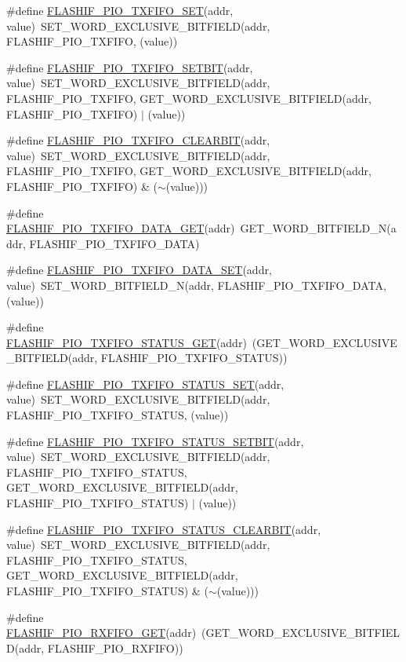 \begin{DoxyCompactItemize}
\#define \hyperlink{a00551_a42e4e34b3ade7887b46be7d86d9ab5f6}{FLASHIF\_\-PIO\_\-TXFIFO\_\-SET}(addr, value)~SET\_\-WORD\_\-EXCLUSIVE\_\-BITFIELD(addr, FLASHIF\_\-PIO\_\-TXFIFO, (value))
\item 
\#define \hyperlink{a00551_a2b4ca60d8d1a10158a23a42154475edd}{FLASHIF\_\-PIO\_\-TXFIFO\_\-SETBIT}(addr, value)~SET\_\-WORD\_\-EXCLUSIVE\_\-BITFIELD(addr, FLASHIF\_\-PIO\_\-TXFIFO, GET\_\-WORD\_\-EXCLUSIVE\_\-BITFIELD(addr, FLASHIF\_\-PIO\_\-TXFIFO) $|$ (value))
\item 
\#define \hyperlink{a00551_a27c6d46f90a6efbfdf27007e287eb5e5}{FLASHIF\_\-PIO\_\-TXFIFO\_\-CLEARBIT}(addr, value)~SET\_\-WORD\_\-EXCLUSIVE\_\-BITFIELD(addr, FLASHIF\_\-PIO\_\-TXFIFO, GET\_\-WORD\_\-EXCLUSIVE\_\-BITFIELD(addr, FLASHIF\_\-PIO\_\-TXFIFO) \& ($\sim$(value)))
\item 
\#define \hyperlink{a00551_a734cd9e347d0c49f25930db7a51330df}{FLASHIF\_\-PIO\_\-TXFIFO\_\-DATA\_\-GET}(addr)~GET\_\-WORD\_\-BITFIELD\_\-N(addr, FLASHIF\_\-PIO\_\-TXFIFO\_\-DATA)
\item 
\#define \hyperlink{a00551_a01dbecbeb0015354621b16b4222647cb}{FLASHIF\_\-PIO\_\-TXFIFO\_\-DATA\_\-SET}(addr, value)~SET\_\-WORD\_\-BITFIELD\_\-N(addr, FLASHIF\_\-PIO\_\-TXFIFO\_\-DATA, (value))
\item 
\#define \hyperlink{a00551_afaefd1b86f2fb798ede470689471e67d}{FLASHIF\_\-PIO\_\-TXFIFO\_\-STATUS\_\-GET}(addr)~(GET\_\-WORD\_\-EXCLUSIVE\_\-BITFIELD(addr, FLASHIF\_\-PIO\_\-TXFIFO\_\-STATUS))
\item 
\#define \hyperlink{a00551_a94273e1a052932994405a98fdf5fafed}{FLASHIF\_\-PIO\_\-TXFIFO\_\-STATUS\_\-SET}(addr, value)~SET\_\-WORD\_\-EXCLUSIVE\_\-BITFIELD(addr, FLASHIF\_\-PIO\_\-TXFIFO\_\-STATUS, (value))
\item 
\#define \hyperlink{a00551_a558e3d79ddabda477c4df86fd52aedef}{FLASHIF\_\-PIO\_\-TXFIFO\_\-STATUS\_\-SETBIT}(addr, value)~SET\_\-WORD\_\-EXCLUSIVE\_\-BITFIELD(addr, FLASHIF\_\-PIO\_\-TXFIFO\_\-STATUS, GET\_\-WORD\_\-EXCLUSIVE\_\-BITFIELD(addr, FLASHIF\_\-PIO\_\-TXFIFO\_\-STATUS) $|$ (value))
\item 
\#define \hyperlink{a00551_a32b6c4ad6177b3ab28c9d4eedfbe8088}{FLASHIF\_\-PIO\_\-TXFIFO\_\-STATUS\_\-CLEARBIT}(addr, value)~SET\_\-WORD\_\-EXCLUSIVE\_\-BITFIELD(addr, FLASHIF\_\-PIO\_\-TXFIFO\_\-STATUS, GET\_\-WORD\_\-EXCLUSIVE\_\-BITFIELD(addr, FLASHIF\_\-PIO\_\-TXFIFO\_\-STATUS) \& ($\sim$(value)))
\item 
\#define \hyperlink{a00551_ab5c1686fd859e57e7bdbc1d73712a880}{FLASHIF\_\-PIO\_\-RXFIFO\_\-GET}(addr)~(GET\_\-WORD\_\-EXCLUSIVE\_\-BITFIELD(addr, FLASHIF\_\-PIO\_\-RXFIFO))

\end{DoxyCompactItemize}
